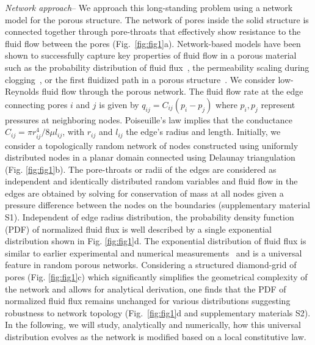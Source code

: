 \documentclass[%
reprint,
 amsmath,amssymb,
 aps,
prl,
]{revtex4-1}
\begin{document}
%
\emph{Network approach}-- We approach this long-standing problem using a network model for the porous structure\cite{fatt1956network, blunt2013pore,stoop2019disorder,bryant1993network,blunt2013pore,dong2009pore,blunt2013pore,blunt1995pore,alim2017local}.
The network of pores inside the solid structure is connected together through pore-throats that effectively show resistance to the fluid flow between the pores (Fig.~\ref{fig:fig1}a). Network-based models have been shown to successfully capture key properties of fluid flow in a porous material such as the probability distribution of fluid flux~\cite{alim2017local}, the permeability scaling during clogging~\cite{shima2021}, or the first fluidized path in a porous structure~\cite{fraggedakis_chaparian_tammisola_2021}.  We consider low-Reynolds fluid flow through the porous network. The fluid flow rate at the edge connecting pores $i$ and $j$ is given by $ q_{ij}  = C_{ij}(p_i - p_j)$ where $p_i,p_j$ represent pressures at neighboring nodes. Poiseuille's law implies that the conductance $C_{ij} = {\pi r_{ij}^4}/{8 \mu l_{ij}}$, with $r_{ij}$ and $l_{ij}$ the edge's radius and length. Initially, we consider a topologically random network of nodes constructed using uniformly distributed nodes in a planar domain connected using Delaunay triangulation (Fig. \ref{fig:fig1}b). The pore-throats or radii of the edges are considered as independent and identically distributed random variables and fluid flow in the edges are obtained by solving for conservation of mass at all nodes given a pressure difference between the nodes on the boundaries (supplementary material S1). Independent of edge radius distribution, the probability density function (PDF) of normalized fluid flux is well described by a single exponential distribution shown in Fig. \ref{fig:fig1}d. The exponential distribution of fluid flux is similar to earlier experimental and numerical measurements~\cite{datta2013spatial,shima2021,alim2017local} and is a universal feature in random porous networks. Considering a structured diamond-grid of pores (Fig. \ref{fig:fig1}c) which significantly simplifies the geometrical complexity of the network and allows for analytical derivation, one finds that the PDF of normalized fluid flux remains unchanged for various distributions suggesting robustness to network topology (Fig.~\ref{fig:fig1}d and supplementary materials S2). In the following, we will study, analytically and numerically, how this universal distribution evolves as the network is modified based on a local constitutive law. 
\end{document}
